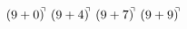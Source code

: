 \documentclass[preview]{standalone}
\begin{document}
\begin{align*}
(9+0)^{\hspace{-0.1cm}\urcorner} \ (9+4)^{\hspace{-0.1cm}\urcorner} \ (9+7)^{\hspace{-0.1cm}\urcorner} \ (9+9)^{\hspace{-0.1cm}\urcorner}
\end{align*}
\end{document}
